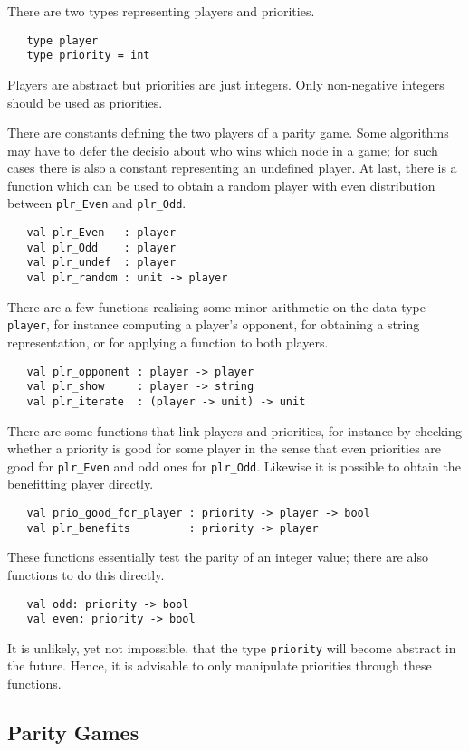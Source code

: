 There are two types representing players and priorities.
\begin{verbatim}
   type player 
   type priority = int
\end{verbatim}
Players are abstract but priorities are just integers. Only non-negative integers should be used as priorities.

There are constants defining the two players of a parity game. Some algorithms may have to defer the decisio about who wins which node in a game;
for such cases there is also a constant representing an undefined player. At last, there is a function which can be used to obtain a random player
with even distribution between \verb#plr_Even# and \verb#plr_Odd#.
\begin{verbatim} 
   val plr_Even   : player
   val plr_Odd    : player
   val plr_undef  : player
   val plr_random : unit -> player
\end{verbatim}
There are a few functions realising some minor arithmetic on the data type \verb#player#, for instance computing a player's opponent, for obtaining
a string representation, or for applying a function to both players.
\begin{verbatim}
   val plr_opponent : player -> player
   val plr_show     : player -> string
   val plr_iterate  : (player -> unit) -> unit
\end{verbatim}
There are some functions that link players and priorities, for instance by checking whether a priority is good for some player in the sense that
even priorities are good for \verb#plr_Even# and odd ones for \verb#plr_Odd#. Likewise it is possible to obtain the benefitting player directly.
\begin{verbatim}
   val prio_good_for_player : priority -> player -> bool
   val plr_benefits         : priority -> player
\end{verbatim}
These functions essentially test the parity of an integer value; there are also functions to do this directly. 					
\begin{verbatim}
   val odd: priority -> bool
   val even: priority -> bool
\end{verbatim}
It is unlikely, yet not impossible, that the type \verb#priority# will become abstract in the future. Hence, it is advisable to only manipulate
priorities through these functions.


\subsection{Parity Games}

